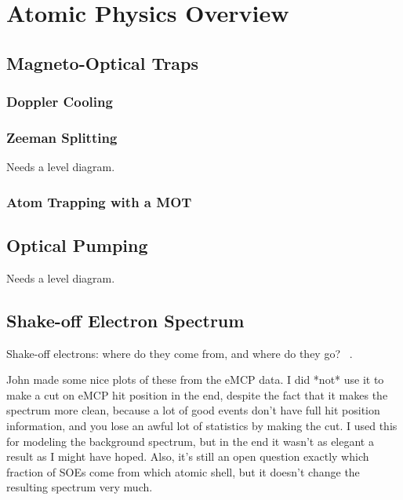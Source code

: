 \clearpage
\chapter{Atomic Physics Overview}
\label{atomicphysics_chapter}
\section{Magneto-Optical Traps}
	\subsection{Doppler Cooling}
	\subsection{Zeeman Splitting}
	Needs a level diagram.
	\subsection{Atom Trapping with a MOT}

\section{Optical Pumping}
Needs a level diagram.


\section{Shake-off Electron Spectrum}
Shake-off electrons:  where do they come from, and where do they go?  ~\cite{Levinger}.

John made some nice plots of these from the eMCP data.  I did *not* use it to make a cut on eMCP hit position in the end, despite the fact that it makes the spectrum more clean, because a lot of good events don't have full hit position information, and you lose an awful lot of statistics by making the cut.  I used this for modeling the background spectrum, but in the end it wasn't as elegant a result as I might have hoped.  Also, it's still an open question exactly which fraction of SOEs come from which atomic shell, but it doesn't change the resulting spectrum very much.


































